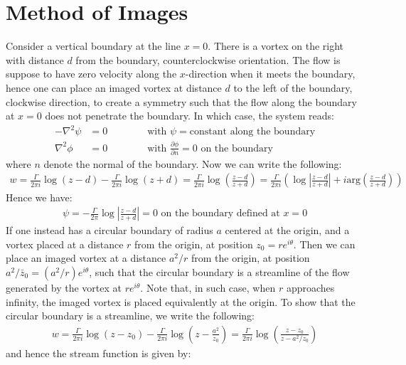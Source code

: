 \documentclass[11pt]{book}
\theoremstyle{break}
\theoremstyle{break}
\begin{document}
\newpage
\section[Method of Images]{\color{red} Method of Images\color{black}}
Consider a vertical boundary at the line $x=0$. There is a vortex on the right with distance $d$ from the boundary, counterclockwise orientation. The flow is suppose to have zero velocity along the $x$-direction when it meets the boundary, hence one can place an imaged vortex at distance $d$ to the left of the boundary, clockwise direction, to create a symmetry such that the flow along the boundary at $x=0$ does not penetrate the boundary. In which case, the system reads:
\begin{align*}
-\nabla^2 \psi &= 0 \qquad\qquad\text{with }\psi = \text{constant along the boundary}\\
\nabla^2 \phi &= 0 \qquad\qquad\text{with }\frac{\partial \phi}{\partial n} = 0\text{ on the boundary}
\end{align*}
where $n$ denote the normal of the boundary. Now we can write the following:
\begin{align*}
w = \frac{\Gamma}{2\pi i}\log(z-d)  - \frac{\Gamma}{2\pi i}\log(z+d) = \frac{\Gamma}{2\pi i}\log\left( \frac{z-d}{z+d}\right) = \frac{\Gamma}{2\pi i}\left( \log\left|\frac{z-d}{z+d}\right| + i \text{arg}\left( \frac{z-d}{z+d}\right)\right)
\end{align*}
Hence we have:
\begin{align*}
\psi = -\frac{\Gamma}{2\pi}\log\left|\frac{z-d}{z+d}\right| = 0 \text{ on the boundary defined at }x=0 
\end{align*}
If one instead has a circular boundary of radius $a$ centered at the origin, and a vortex placed at a distance $r$ from the origin, at position $z_0 = re^{i\theta}$. Then we can place an imaged vortex at a distance $a^2/r$ from the origin, at position $a^2 / \bar{z}_0= (a^2/r)e^{i\theta}$, such that the circular boundary is a streamline of the flow generated by the vortex at $re^{i\theta}$. Note that, in such case, when $r$ approaches infinity, the imaged vortex is placed equivalently at the origin. To show that the circular boundary is a streamline, we write the following:
\begin{align}
w = \frac{\Gamma}{2\pi i}\log(z - z_0) - \frac{\Gamma}{2\pi i}\log\left( z - \frac{a^2}{z_0}\right) = \frac{\Gamma}{2\pi i}\log\left( \frac{z-z_0}{z- a^2/z_0}\right)
\end{align}
and hence the stream function is given by:
\end{document}
